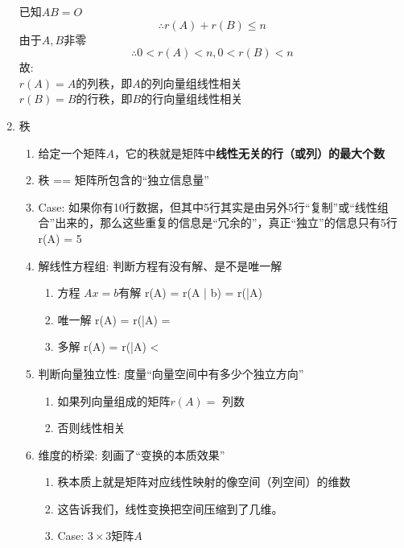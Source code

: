 \documentclass[a4paper,12pt]{article}
\begin{document}
\begin{enumerate}
        \begin{analysisbox}
            已知$AB = O$
            \[
                \therefore r(A) + r(B) \le n
            \]
            由于$A, B$非零
            \[
                \therefore 0 < r(A) < n, 0 < r(B) < n
            \]
            故: \\
            $r(A) = A$的列秩，即$A$的列向量组线性相关 \\
            $r(B) = B$的行秩，即$B$的行向量组线性相关
        \end{analysisbox}
        \item 秩
        \begin{enumerate}
            \item 给定一个矩阵$A$，它的秩就是矩阵中\textbf{线性无关的行（或列）的最大个数}
            \item 秩 == 矩阵所包含的“独立信息量”
            \item Case: 如果你有10行数据，但其中5行其实是由另外5行“复制”或“线性组合”出来的，那么这些重复的信息是“冗余的”，真正“独立”的信息只有5行 \Rightarrow r(A) = 5
            \item 解线性方程组: 判断方程有没有解、是不是唯一解
            \begin{enumerate}
                \item 方程 $Ax = b$有解 \Leftrightarrow r(A) = r(A | b) = r(\bar{A})
                \item 唯一解 \Leftrightarrow r(A) = r(\bar{A}) = 
                \item 多解 \Leftrightarrow r(A) = r(\bar{A}) < 
            \end{enumerate}
            \item 判断向量独立性: 度量“向量空间中有多少个独立方向”
            \begin{enumerate}
                \item 如果列向量组成的矩阵$r(A) =$ 列数 \Rightarrow {}
                \item 否则线性相关
            \end{enumerate}
            \item 维度的桥梁: 刻画了“变换的本质效果”
            \begin{enumerate}
                \item 秩本质上就是矩阵对应线性映射的像空间（列空间）的维数
                \item 这告诉我们，线性变换把空间压缩到了几维。
                \item Case: $3 \times 3$矩阵$A$

\end{enumerate}
\end{enumerate}
\end{enumerate}
\end{document}
